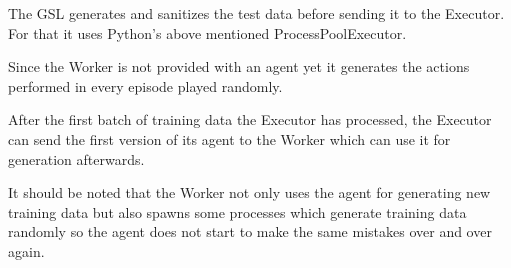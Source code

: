 \begin{itemize}[label={}]
        The GSL generates and sanitizes the test data
        before sending it to the Executor. For that it uses
        Python's above mentioned ProcessPoolExecutor.

        Since the Worker is not provided with an agent yet
        it generates the actions performed in every episode
        played randomly.

        After the first batch of training data the Executor
        has processed, the Executor can send the first
        version of its agent to the Worker which can use it
        for generation afterwards.

        It should be noted that the Worker not only uses
        the agent for generating new training data but also
        spawns some processes which generate training data
        randomly so the agent does not start to make the
        same mistakes over and over again.

\end{itemize}



